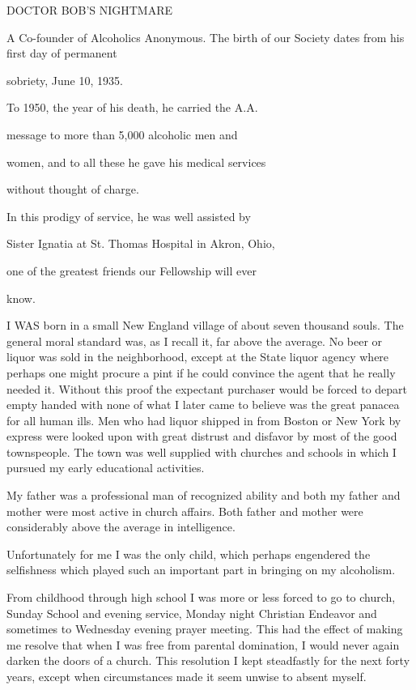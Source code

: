 

\begin{biblechapter}

DOCTOR BOB’S NIGHTMARE

A Co-founder of Alcoholics Anonymous. The birth
of our Society dates from his first day of permanent

sobriety, June 10, 1935.

To 1950, the year of his death, he carried the A.A.

message  to  more  than  5,000  alcoholic  men  and

women, and to all these he gave his medical services

without thought of charge.

In this prodigy of service, he was well assisted by

Sister Ignatia at St. Thomas Hospital in Akron, Ohio,

one of the greatest friends our Fellowship will ever

know.


I WAS born in a small New England village of about seven thousand souls. The general moral standard was, as I recall it, far above the average. No beer or liquor was sold in the neighborhood, except at the State liquor agency where perhaps one might procure a pint if he could convince the agent that he really needed it. Without this proof the expectant purchaser would be forced to depart empty handed with none of what I later came to believe was the great panacea for all human ills. Men who had liquor shipped in from Boston or New York by express were looked upon with great distrust and disfavor by most of the good townspeople. The town was well supplied with churches and schools in which I pursued my early educational activities.

My father was a professional man of recognized ability and both my father and mother were most active in church affairs. Both father and mother were considerably above the average in intelligence.

Unfortunately for me I was the only child, which perhaps engendered the selfishness which played such an important part in bringing on my alcoholism.

From childhood through high school I was more or less forced to go to church, Sunday School and evening service, Monday night Christian Endeavor and sometimes to Wednesday evening prayer meeting. This had the effect of making me resolve that when I was free from parental domination, I would never again darken the doors of a church. This resolution I kept steadfastly for the next forty years, except when circumstances made it seem unwise to absent myself.


\end{biblechapter}
